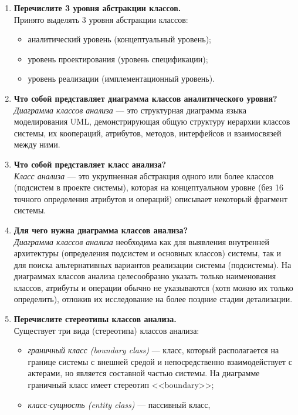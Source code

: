 \begin{enumerate}
	\item \textbf{Перечислите 3 уровня абстракции классов.}\\
	Принято выделять 3 уровня абстракции классов:
	\begin{itemize}
		\item аналитический уровень (концептуальный уровень);
		\item уровень проектирования (уровень спецификации);
		\item уровень реализации (имплементационный уровень).
	\end{itemize}
	\item \textbf{Что собой представляет диаграмма классов
	аналитического уровня?}\\
	\textit{Диаграмма классов анализа} --- это структурная диаграмма языка
	моделирования UML, демонстрирующая общую структуру иерархии классов
	системы, их коопераций, атрибутов, методов, интерфейсов
	и взаимосвязей между ними.
	\item \textbf{Что собой представляет класс анализа?}\\
	\textit{Класс анализа} --- это укрупненная абстракция одного
	или более классов (подсистем в проекте системы),
	которая на концептуальном уровне
	(без 16 точного определения атрибутов и операций)
	описывает некоторый фрагмент системы.
	\item \textbf{Для чего нужна диаграмма классов анализа?}\\
	\textit{Диаграмма классов анализа} необходима как для выявления
	внутренней архитектуры (определения подсистем и основных классов)
	системы, так и для поиска альтернативных вариантов реализации системы
	(подсистемы). На диаграммах классов анализа целесообразно указать
	только наименования классов, атрибуты и операции обычно не указываются
	(хотя можно их только определить), отложив их исследование
	на более поздние стадии детализации.
	\item \textbf{Перечислите стереотипы классов анализа.}\\
	Существует три вида (стереотипа) классов анализа:
	\begin{itemize}
		\item \textit{граничный класс (boundary class)} --- класс,
		который располагается на границе системы с внешней средой
		и непосредственно взаимодействует с актерами, но является
		составной частью системы.
		На диаграмме граничный класс имеет стереотип <<boundary>>;
		\item \textit{класс-сущность (entity class)} --- пассивный класс,

\end{itemize}
\end{enumerate}
